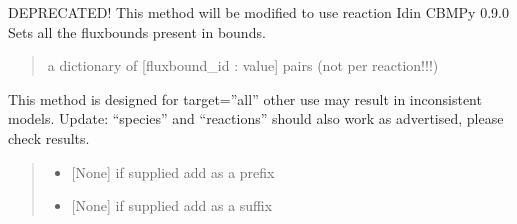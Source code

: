 \documentclass[letterpaper,12pt,english]{sphinxmanual}
\begin{document}
\begin{fulllineitems}
\begin{fulllineitems}
\label{\detokenize{api/core:cbmpy.CBModel.Model.setFluxBoundsFromDict}}
\pysigstartsignatures
\pysiglinewithargsret
{}
{}
{}
\pysigstopsignatures
\sphinxAtStartPar
DEPRECATED! This method will be modified to use reaction Idin CBMPy 0.9.0 Sets all the fluxbounds present in bounds.
\begin{quote}\begin{description}
\sphinxAtStartPar
{} \textendash{} a dictionary of {[}fluxbound\_id : value{]} pairs (not per reaction!!!)

\end{description}\end{quote}

\end{fulllineitems}


\begin{fulllineitems}
\label{\detokenize{api/core:cbmpy.CBModel.Model.renameObjectIds}}
\pysigstartsignatures
\pysiglinewithargsret
{}
{\sphinxparamcomma {}\sphinxparamcomma {}\sphinxparamcomma {}}
{}
\pysigstopsignatures
\sphinxAtStartPar
This method is designed for target=”all” other use may result in inconsistent models. Update: “species” and “reactions” should also work as advertised, please check results.
\begin{quote}\begin{description}
\begin{itemize}
\item {} 
\sphinxAtStartPar
{} \textendash{} {[}None{]} if supplied add as a prefix

\item {} 
\sphinxAtStartPar
{} \textendash{} {[}None{]} if supplied add as a suffix


\end{itemize}
\end{description}
\end{quote}
\end{fulllineitems}
\end{fulllineitems}
\end{document}
